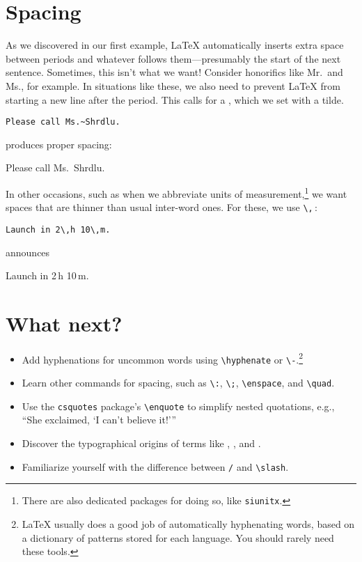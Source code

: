 \section{Spacing}

As we discovered in our first example,
\LaTeX{} automatically inserts extra space between periods and whatever
follows them---presumably the start of the next sentence.
Sometimes, this isn't what we want!
Consider honorifics like Mr.\ and Ms., for example.
In situations like these, we also need to prevent \LaTeX{} from starting a
new line after the period.
This calls for a , which we set with a tilde.
\begin{leftfigure}
\begin{lstlisting}
Please call Ms.~Shrdlu.
\end{lstlisting}
\end{leftfigure}
produces proper spacing:
\begin{leftfigure}
\lm%
Please call Ms.~Shrdlu.
\end{leftfigure}

In other occasions, such as when we abbreviate units of
measurement,\punckern\footnote{There are also dedicated packages for doing so,
like \texttt{siunitx}.}
we want spaces that are thinner than usual inter-word ones.
For these, we use \verb|\,|\,:
\begin{leftfigure}
\begin{lstlisting}
Launch in 2\,h 10\,m.
\end{lstlisting}
\end{leftfigure}
announces
\begin{leftfigure}
\lm%
Launch in 2\,h 10\,m.
\end{leftfigure}

\section{What next?}
\begin{itemize}
\item Add hyphenations for uncommon words using \verb|\hyphenate|
    or \verb|\-|.\punckern\footnote{\LaTeX{} usually does a good
    job of automatically hyphenating words, based on a dictionary of patterns
    stored for each language. You should rarely need these tools.}
\item Learn other commands for spacing, such as \verb|\:|, \verb|\;|,
    \verb|\enspace|, and \verb|\quad|.
\item Use the \texttt{csquotes} package's \verb|\enquote| to simplify
    nested quotations, e.g., \\
    \enquote{She exclaimed, \enquote{I can't believe it!}}
\item Discover the typographical origins of terms like ,
    , and .
\item Familiarize yourself with the difference between \texttt{/} and
    \verb|\slash|.
\end{itemize}
